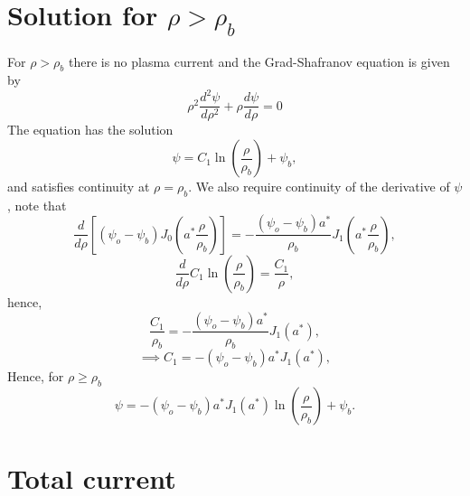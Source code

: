 \documentclass{article}
\begin{document}

\section{Solution for $\rho>\rho_b$}

For $\rho>\rho_b$ there is no plasma current and the Grad-Shafranov equation is given by
\[\rho^2\frac{d^2\psi}{d \rho^2} + \rho\frac{d \psi}{d \rho} = 0\]
The equation has the solution
\[\psi = C_1\ln\left(\frac{\rho}{\rho_b}\right) + \psi_b,\]
and satisfies continuity at $\rho=\rho_b$.
We also require continuity of the derivative of $\psi$, note that
\[\frac{d}{d\rho}\left[(\psi_o-\psi_b)J_0\left(a^*\frac{\rho}{\rho_b}\right)\right]=-\frac{(\psi_o-\psi_b)a^*}{\rho_b}J_1\left(a^*\frac{\rho}{\rho_b}\right),\]
\[\frac{d}{d\rho} C_1\ln\left(\frac{\rho}{\rho_b}\right) = \frac{C_1}{\rho},\]
hence,
\[\frac{C_1}{\rho_b} = -\frac{(\psi_o-\psi_b)a^*}{\rho_b}J_1(a^*),\]
\[\implies C_1 = -(\psi_o-\psi_b)a^*J_1(a^*),\]
Hence, for $\rho\ge\rho_b$
\[\psi = -(\psi_o-\psi_b)a^*J_1(a^*)\ln\left(\frac{\rho}{\rho_b}\right) + \psi_b.\]

\section{Total current}
\end{document}
